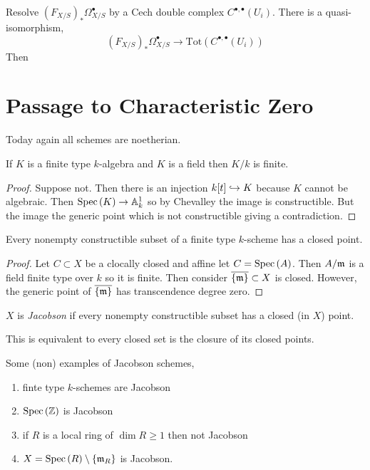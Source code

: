 \documentclass[12pt]{article}
\begin{document}
Resolve $(F_{X/S})_* \Omega^\bullet_{X/S}$ by a Cech double complex $C^{\bullet, \bullet}(U_i)$. There is a quasi-isomorphism,
\[ (F_{X/S})_* \Omega_{X/S}^\bullet \to \mathrm{Tot}\left( C^{\bullet, \bullet}(U_i) \right) \]
Then


\section{Passage to Characteristic Zero}

\begin{rmk}
Today again all schemes are noetherian.
\end{rmk}

\begin{prop}[Nullstellensatz]
If $K$ is a finite type $k$-algebra and $K$ is a field then $K/k$ is finite.
\end{prop}

\begin{proof}
Suppose not. Then there is an injection $k[t] \hookrightarrow K$ because $K$ cannot be algebraic. Then $\mathrm{Spec}\left( K \right) \to \mathbb{A}^1_k$ so by Chevalley the image is constructible. But the image the generic point which is not constructible giving a contradiction. 
\end{proof}

\begin{cor}
Every nonempty constructible subset of a finite type $k$-scheme has a closed point.
\end{cor}

\begin{proof}
Let $C \subset X$ be a clocally closed and affine let $C = \mathrm{Spec}\left( A \right)$. Then $A / \mathfrak{m}$ is a field finite type over $k$ so it is finite. Then consider $\overline{\{ \mathfrak{m} \}} \subset X$ is closed. However, the generic point of $\overline{ \{ \mathfrak{m} \} }$ has transcendence degree zero.  
\end{proof}

\begin{defn}
$X$ is \textit{Jacobson} if every nonempty constructible subset has a closed (in $X$) point.
\end{defn}

\begin{rmk}
This is equivalent to every closed set is the closure of its closed points.
\end{rmk}

\begin{example}
Some (non) examples of Jacobson schemes,
\begin{enumerate}
\item finte type $k$-schemes are Jacobson
\item $\mathrm{Spec}\left( \mathbb{Z} \right)$ is Jacobson
\item if $R$ is a local ring of $\dim{R} \ge 1$ then not Jacobson
\item $X = \mathrm{Spec}\left( R \right) \setminus \{ \mathfrak{m}_R \}$ is Jacobson.
\end{enumerate}
\end{example}
\end{document}
